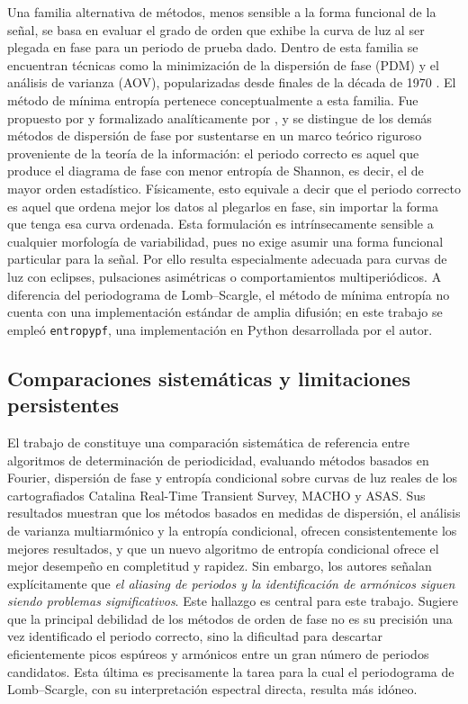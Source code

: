 \documentclass[12pt,letterpaper,oneside]{book}
\begin{document}
Una familia alternativa de m\'etodos, menos sensible a la forma funcional de la se\~nal, se basa en evaluar el grado de orden que exhibe la curva de luz al ser plegada en fase para un periodo de prueba dado. Dentro de esta familia se encuentran t\'ecnicas como la minimizaci\'on de la dispersi\'on de fase (PDM) y el an\'alisis de varianza (AOV), popularizadas desde finales de la d\'ecada de 1970 \citep[v\'ease la revisi\'on de][]{Graham2013}. El m\'etodo de m\'inima entrop\'ia pertenece conceptualmente a esta familia. Fue propuesto por \citet{cincotta_1995} y formalizado anal\'iticamente por \citet{cincotta_1999}, y se distingue de los dem\'as m\'etodos de dispersi\'on de fase por sustentarse en un marco te\'orico riguroso proveniente de la teor\'ia de la informaci\'on: el periodo correcto es aquel que produce el diagrama de fase con menor entrop\'ia de Shannon, es decir, el de mayor orden estad\'istico. F\'isicamente, esto equivale a decir que el periodo correcto es aquel que ordena mejor los datos al plegarlos en fase, sin importar la forma que tenga esa curva ordenada. Esta formulaci\'on es intr\'insecamente sensible a cualquier morfolog\'ia de variabilidad, pues no exige asumir una forma funcional particular para la se\~nal. Por ello resulta especialmente adecuada para curvas de luz con eclipses, pulsaciones asim\'etricas o comportamientos multiperi\'odicos. A diferencia del periodograma de Lomb--Scargle, el m\'etodo de m\'inima entrop\'ia no cuenta con una implementaci\'on est\'andar de amplia difusi\'on; en este trabajo se emple\'o \texttt{entropypf}, una implementaci\'on en Python desarrollada por el autor.

\subsection{Comparaciones sistem\'aticas y limitaciones persistentes}

El trabajo de \citet{Graham2013} constituye una comparaci\'on sistem\'atica de referencia entre algoritmos de determinaci\'on de periodicidad, evaluando m\'etodos basados en Fourier, dispersi\'on de fase y entrop\'ia condicional sobre curvas de luz reales de los cartografiados Catalina Real-Time Transient Survey, MACHO y ASAS. Sus resultados muestran que los m\'etodos basados en medidas de dispersi\'on, el an\'alisis de varianza multiarm\'onico y la entrop\'ia condicional, ofrecen consistentemente los mejores resultados, y que un nuevo algoritmo de entrop\'ia condicional ofrece el mejor desempe\~no en completitud y rapidez. Sin embargo, los autores se\~nalan expl\'icitamente que \emph{el aliasing de periodos y la identificaci\'on de arm\'onicos siguen siendo problemas significativos}. Este hallazgo es central para este trabajo. Sugiere que la principal debilidad de los m\'etodos de orden de fase no es su precisi\'on una vez identificado el periodo correcto, sino la dificultad para descartar eficientemente picos esp\'ureos y arm\'onicos entre un gran n\'umero de periodos candidatos. Esta \'ultima es precisamente la tarea para la cual el periodograma de Lomb--Scargle, con su interpretaci\'on espectral directa, resulta m\'as id\'oneo.
\end{document}
